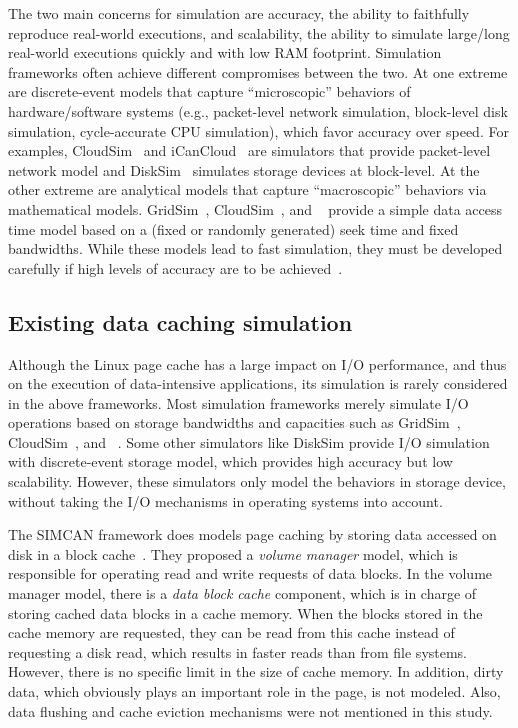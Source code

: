 The two main concerns for simulation are accuracy, the ability to 
faithfully reproduce real-world executions, and scalability, 
the ability to simulate large/long real-world executions quickly 
and with low RAM footprint. 
Simulation frameworks often achieve different compromises between the two.  
At one extreme are discrete-event models that capture
``microscopic'' behaviors of hardware/software systems (e.g.,
packet-level network simulation, block-level disk simulation,
cycle-accurate CPU simulation), which favor accuracy over speed.  
For examples, CloudSim~\cite{cloudsim} and 
iCanCloud~\cite{nunez2012icancloud} are simulators that provide 
packet-level network model and DiskSim~\cite{bucy2003disksim} simulates 
storage devices at block-level.  
At the other extreme are analytical models that capture
``macroscopic'' behaviors via mathematical models.  
GridSim~\cite{gridsim}, CloudSim~\cite{cloudsim}, and 
\simgrid~\cite{casanova2014simgrid} provide a simple data access time 
model based on a (fixed or randomly generated) seek time and 
fixed bandwidths. 
While these models lead to fast simulation, they must be developed
carefully if high levels of accuracy are to be achieved~\cite{velhoTOMACS2013}. 

\subsection{Existing data caching simulation}

Although the Linux page cache has a large impact on I/O performance, 
and thus on the execution of data-intensive applications, 
its simulation is rarely considered in the above frameworks.  
Most simulation frameworks merely simulate I/O operations based on 
storage bandwidths and capacities such as GridSim~\cite{gridsim}, 
CloudSim~\cite{cloudsim}, and \simgrid~\cite{casanova2014simgrid}. 
Some other simulators like DiskSim provide I/O simulation with 
discrete-event storage model, which provides high accuracy 
but low scalability. However, these simulators only model 
the behaviors in storage device, without taking the I/O mechanisms 
in operating systems into account. 

The SIMCAN framework does models page caching by storing data 
accessed on disk in a block cache~\cite{nunez2012simcan}. 
They proposed a \textit{volume manager} model, which is responsible for 
operating read and write requests of data blocks. 
In the volume manager model, there is a \textit{data block cache} component, 
which is in charge of storing cached data blocks in a cache memory. 
When the blocks stored in the cache memory are requested, they can be 
read from this cache instead of requesting a disk read, which results in 
faster reads than from file systems.
However, there is no specific limit in the size of cache memory. 
In addition, dirty data, which obviously plays an important role in the page,
is not modeled. 
Also, data flushing and cache eviction mechanisms were not mentioned 
in this study. 

